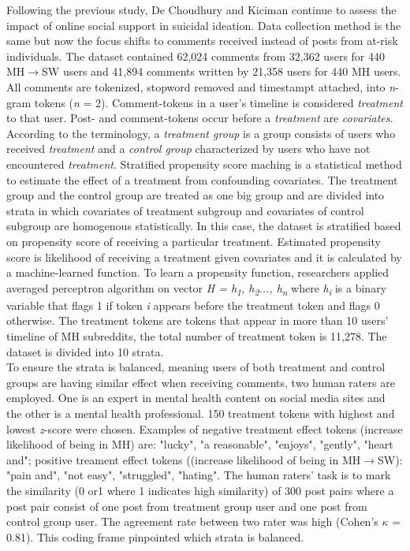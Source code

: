 Following the previous study, De Choudhury and Kiciman \cite{DeChoudhury2017} continue to assess the impact of online social support in suicidal ideation. Data collection method is the same but now the focus shifts to comments received instead of posts from at-risk individuals. The dataset contained 62,024 comments from 32,362 users for 440 MH$\rightarrow$SW users and 41,894 comments written by 21,358 users for 440 MH users. All comments are tokenized, stopword removed and timestampt attached, into \textit{n}-gram tokens (\textit{n} = 2). Comment-tokens in a user's timeline is considered \textit{treatment} to that user. Post- and comment-tokens occur before a \textit{treatment} are \textit{covariates}. According to the terminology, a \textit{treatment group} is a group consists of users who received \textit{treatment} and a \textit{control group} characterized by users who have not encountered \textit{treatment}. Stratified propensity score maching is a statistical method to estimate the effect of a treatment from confounding covariates. The treatment group and the control group are treated as one big group and are divided into strata in which covariates of treatment subgroup and covariates of control subgroup are homogenous statistically. In this case, the dataset is stratified based on propensity score of receiving a particular treatment. Estimated propensity score is likelihood of receiving a treatment given covariates and it is calculated by a machine-learned function. To learn a propensity function, researchers applied averaged perceptron algorithm on vector \textit{H = h\textsubscript{1}, h\textsubscript{2}..., h\textsubscript{n}} where \textit{h\textsubscript{i}} is a binary variable that flags 1 if token \textit{i} appears before the treatment token and flags 0 otherwise. The treatment tokens are tokens that appear in more than 10 users' timeline of MH subreddits, the total number of treatment token is 11,278. The dataset is divided into 10 strata.\\
To ensure the strata is balanced, meaning users of both treatment and control groups are having similar effect when receiving comments, two human raters are employed. One is an expert in mental health content on social media sites and the other is a mental health professional. 150 treatment tokens with highest and lowest \textit{z}-score were chosen. Examples of negative treatment effect tokens (increase likelihood of being in MH) are: "lucky", "a reasonable", "enjoys", "gently", "heart and"; positive treament effect tokens ((increase likelihood of being in MH$\rightarrow$SW): "pain and", "not easy", "struggled", "hating". The human raters' task is to mark the similarity (0 or1 where 1 indicates high similarity) of 300 post pairs where a post pair consist of one post from treatment group user and one post from control group user. The agreement rate between two rater was high (Cohen's $\kappa$ = 0.81). This coding frame pinpointed which strata is balanced.\\
